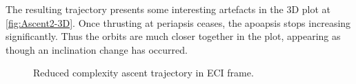 The resulting trajectory presents some interesting artefacts in the 3D plot at \autoref{fig:Ascent2-3D}. Once thrusting at periapsis ceases, the apoapsis stops increasing significantly. Thus the orbits are much closer together in the plot, appearing as though an inclination change has occurred.

\begin{figure}
\caption{Reduced complexity ascent trajectory in ECI frame.} \label{fig:Ascent2-3D}
\centering
\def\svgwidth{\figurewidth}

\end{figure}

%
%
%
%
%
%
%
%
%
%
%

